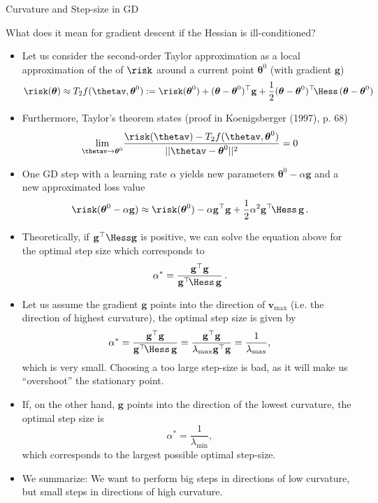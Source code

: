 \documentclass[11pt,compress,t,notes=noshow, xcolor=table]{beamer}
\begin{document}
\begin{vbframe}{Curvature and Step-size in GD}

What does it mean for gradient descent if the Hessian is ill-conditioned?

 \begin{itemize}
 \item Let us consider the second-order Taylor approximation as a local approximation of the of $\risk$ around a current point $\boldsymbol{\theta}^0$ (with gradient $\mathbf{g}$)
    \begin{equation*}
    \risk(\boldsymbol{\theta}) \approx T_2f(\thetav, \boldsymbol{\theta}^0) := \risk(\boldsymbol{\theta}^0) + (\boldsymbol{\theta}-\boldsymbol{\theta}^0)^\top \mathbf{g} + \frac{1}{2}(\boldsymbol{\theta}-\boldsymbol{\theta}^0)^\top \!\Hess\, (\boldsymbol{\theta}-\boldsymbol{\theta}^0)
    \end{equation*}
  \item Furthermore, Taylor's theorem states (proof in Koenigsberger (1997), p. 68)
    \begin{equation*}
     \underset{\thetav \rightarrow \boldsymbol{\theta}^0}{\lim} \frac{\risk(\thetav) - T_2f(\thetav, \boldsymbol{\theta}^0)}{||\thetav-\boldsymbol{\theta}^0||^2} = 0
   \end{equation*}

  \framebreak 

  \item One GD step with a learning rate $\alpha$ yields new parameters $\boldsymbol{\theta}^0-\alpha \mathbf{g}$ and a new approximated loss value
   $$
   \risk(\boldsymbol{\theta}^0-\alpha \mathbf{g}) \approx \risk(\boldsymbol{\theta}^0) - \alpha \mathbf{g}^\top\mathbf{g} + \frac{1}{2}	\alpha^2 \mathbf{g}^\top\!\Hess\,\mathbf{g}  \,.
   $$ 
 
 \item Theoretically, if $\mathbf{g}^\top \Hess \mathbf{g}$ is positive, we can solve the equation above for the optimal step size which corresponds to 
 $$
 \alpha^* = \frac{\mathbf{g}^\top \mathbf{g}}{\mathbf{g}^\top \!\Hess\, \mathbf{g}}  \,.
 $$
 
 \framebreak 

 \item Let us assume the gradient $\mathbf{g}$ points into the direction of $\bm{v}_{\text{max}}$ (i.e. the direction of highest curvature), the optimal step size is given by 
  $$
  \alpha^* = \frac{\mathbf{g}^\top \mathbf{g}}{\mathbf{g}^\top \!\Hess\, \mathbf{g}} = \frac{\mathbf{g}^\top \mathbf{g}}{\lambda_{\text{max}} \mathbf{g}^\top   \mathbf{g}} = \frac{1}{\lambda_{\text{max}}}, 
  $$ 
  which is very small. Choosing a too large step-size is bad, as it will make us \enquote{overshoot} the stationary point.
  \item If, on the other hand, $\mathbf{g}$ points into the direction of the lowest curvature, the optimal step size is 
  $$
  \alpha^* = \frac{1}{\lambda_{\text{min}}}, 
  $$
  which corresponds to the largest possible optimal step-size.
  \item We summarize: We want to perform big steps in directions of low curvature, but small steps in directions of high curvature.


\end{itemize}
\end{vbframe}
\end{document}
